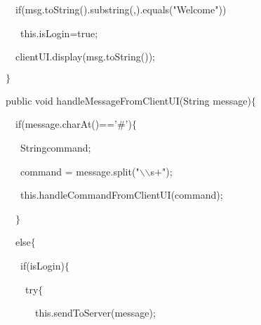 {{\hlstd }{\hlstd\ \ }{\hlstd }{\hlkwa if}{\hlstd }{\hlsym (}{\hlstd msg}{\hlsym .}{\hlstd }{\hlkwd toString}{\hlstd }{\hlsym ().}{\hlstd }{\hlkwd substring}{\hlstd }{\hlsym (}{\hlstd }{}{\hlstd }{\hlsym ,}{\hlstd }{}{\hlstd }{\hlsym ).}{\hlstd }{\hlkwd equals}{\hlstd }{\hlsym (}{\hlstd }{\hlstr "Welcome"}{\hlstd }{\hlsym ))}\leavevmode\par
{\hlstd }{\hlstd\ \ \ }{\hlstd }{\hlkwa this}{\hlstd }{\hlsym .}{\hlstd isLogin}{\hlsym $\mathord{=}$}{\hlstd true}{\hlsym ;}\leavevmode\par
{\hlstd }{\hlstd\ \ }{\hlstd clientUI}{\hlsym .}{\hlstd }{\hlkwd display}{\hlstd }{\hlsym (}{\hlstd msg}{\hlsym .}{\hlstd }{\hlkwd toString}{\hlstd }{\hlsym ());}\leavevmode\par
{\hlstd 	}{\hlsym $\}$}\leavevmode\par
{\hlstd \leavevmode\par
	}{\hlkwa public }{\hlstd }{\hlkwb void }{\hlstd }{\hlkwd handleMessageFromClientUI}{\hlstd }{\hlsym (}{\hlstd }{\hlkwc String }{\hlstd message}{\hlsym )$\{$}\leavevmode\par
{\hlstd }{\hlstd\ \ }{\hlstd }{\hlkwa if}{\hlstd }{\hlsym (}{\hlstd message}{\hlsym .}{\hlstd }{\hlkwd charAt}{\hlstd }{\hlsym (}{\hlstd }{}{\hlstd }{\hlsym )$\mathord{=}$$\mathord{=}$}{\hlstd }{\hlstr '\#'}{\hlstd }{\hlsym )$\{$}\leavevmode\par
{\hlstd }{\hlstd\ \ \ }{\hlstd }{\hlkwc String}{\hlstd }{\hlsym [] }{\hlstd command}{\hlsym ;}\leavevmode\par
{\hlstd }{\hlstd\ \ \ }{\hlstd command }{\hlsym $\mathord{=}$ }{\hlstd message}{\hlsym .}{\hlstd }{\hlkwd split}{\hlstd }{\hlsym (}{\hlstd }{\hlstr "}{\hlesc $\backslash$$\backslash$}{\hlstr s$\mathord{+}$"}{\hlstd }{\hlsym );}\leavevmode\par
{\hlstd }{\hlstd\ \ \ }{\hlstd }{\hlkwa this}{\hlstd }{\hlsym .}{\hlstd }{\hlkwd handleCommandFromClientUI}{\hlstd }{\hlsym (}{\hlstd command}{\hlsym );}\leavevmode\par
{\hlstd }{\hlstd\ \ }{\hlstd }{\hlsym $\}$}\leavevmode\par
{\hlstd }{\hlstd\ \ }{\hlstd }{\hlkwa else}{\hlstd }{\hlsym $\{$}\leavevmode\par
{\hlstd }{\hlstd\ \ \ }{\hlstd }{\hlkwa if}{\hlstd }{\hlsym (}{\hlstd isLogin}{\hlsym )$\{$}\leavevmode\par
{\hlstd }{\hlstd\ \ \ \ }{\hlstd }{\hlkwa try}{\hlstd }{\hlsym $\{$}\leavevmode\par
{\hlstd }{\hlstd\ \ \ \ \ \ }{\hlstd }{\hlkwa this}{\hlstd }{\hlsym .}{\hlstd }{\hlkwd sendToServer}{\hlstd }{\hlsym (}{\hlstd message}{\hlsym );}\leavevmode\par
}
